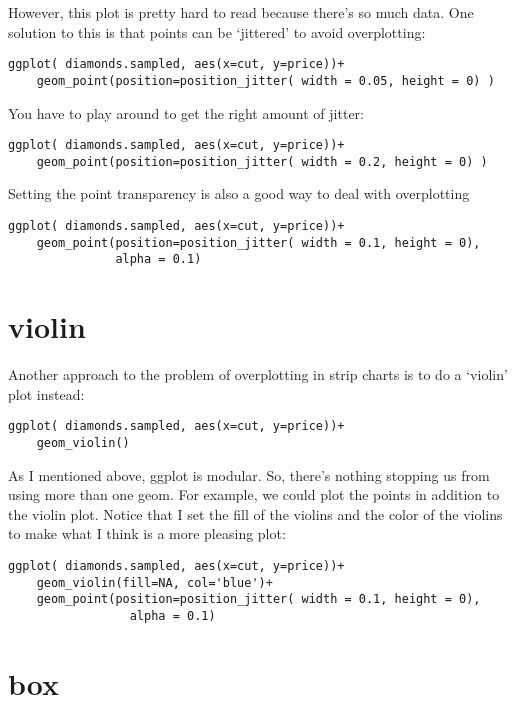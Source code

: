 \documentclass[11pt]{article}
\begin{document}
However, this plot is pretty hard to read because there's so much
data. One solution to this is that points can be `jittered' to avoid overplotting:

\begin{verbatim}
ggplot( diamonds.sampled, aes(x=cut, y=price))+
    geom_point(position=position_jitter( width = 0.05, height = 0) )
\end{verbatim}


You have to play around to get the right amount of jitter:

\begin{verbatim}
ggplot( diamonds.sampled, aes(x=cut, y=price))+
    geom_point(position=position_jitter( width = 0.2, height = 0) )
\end{verbatim}


Setting the point transparency is also a good way to deal with overplotting

\begin{verbatim}
ggplot( diamonds.sampled, aes(x=cut, y=price))+
    geom_point(position=position_jitter( width = 0.1, height = 0),
               alpha = 0.1)
\end{verbatim}
\section{violin}
\label{sec-2}


Another approach to the problem of overplotting in strip charts is to
do a `violin' plot instead:

\begin{verbatim}
ggplot( diamonds.sampled, aes(x=cut, y=price))+
    geom_violin()
\end{verbatim}


As I mentioned above, ggplot is modular. So, there's nothing stopping
us from using more than one geom. For example, we could plot the
points in addition to the violin plot. Notice that I set the fill of
the violins and the color of the violins to make what I think is a
more pleasing plot:

\begin{verbatim}
ggplot( diamonds.sampled, aes(x=cut, y=price))+
    geom_violin(fill=NA, col='blue')+
    geom_point(position=position_jitter( width = 0.1, height = 0),
                 alpha = 0.1)
\end{verbatim}
\section{box}
\label{sec-3}
\end{document}
